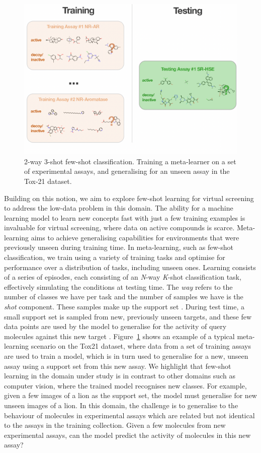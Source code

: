 \documentclass[journal=acscii,manuscript=article]{achemso}
\begin{document}
\begin{figure}
  \centering
  \includegraphics[width=0.8\linewidth]{img/tox21-metalearning.png}
  \caption{2-way 3-shot few-shot classification. Training a meta-learner on a set of experimental assays, and generalising for an unseen assay in the Tox-21 dataset.}
\label{fig:tox21metalearning}
\end{figure}

Building on this notion, we aim to explore few-shot learning for virtual screening to address the low-data problem in this domain. The ability for a machine learning model to learn new concepts fast with just a few training examples is invaluable for virtual screening, where data on active compounds is scarce. Meta-learning aims to achieve generalising capabilities for environments that were previously unseen during training time. In meta-learning, such as few-shot classification, we train using a variety of training tasks and optimise for performance over a distribution of tasks, including unseen ones. Learning consists of a series of episodes, each consisting of an \textit{N}-way \textit{K}-shot classification task, effectively simulating the conditions at testing time. The \textit{way} refers to the number of classes we have per task and the number of samples we have is the \textit{shot} component. These samples make up the support set \cite{snell2017prototypical}. During test time, a small support set is sampled from new, previously unseen targets, and these few data points are used by the model to generalise for the activity of query molecules against this new target \cite{vinyals2016matching}. Figure~\ref{fig:tox21metalearning} shows an example of a typical meta-learning scenario on the Tox21 dataset, where data from a set of training assays are used to train a model, which is in turn used to generalise for a new, unseen assay using a support set from this new assay. We highlight that few-shot learning in the domain under study is in contrast to other domains such as computer vision, where the trained model recognises new classes. For example, given a few images of a lion as the support set, the model must generalise for new unseen images of a lion. In this domain, the challenge is to generalise to the behaviour of molecules in experimental assays which are related but not identical to the assays in the training collection. Given a few molecules from new experimental assays, can the model predict the activity of molecules in this new assay?
\end{document}
